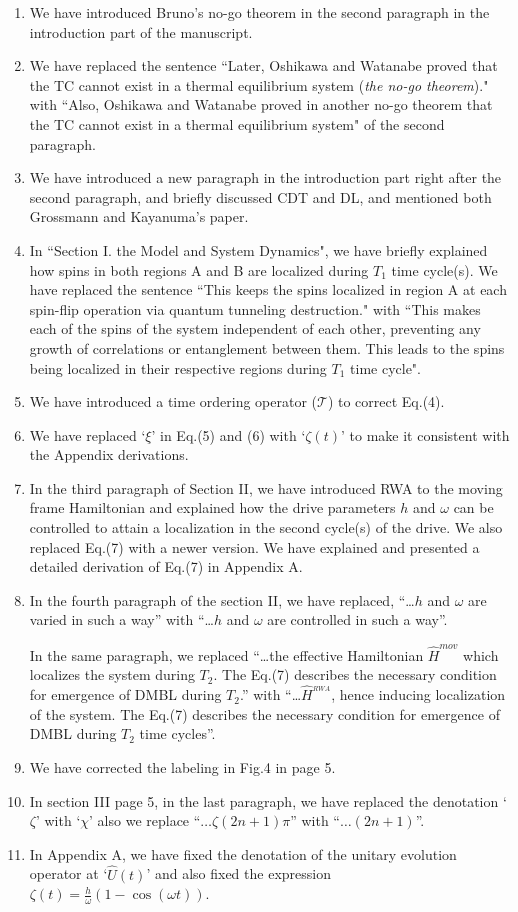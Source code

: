 \documentclass[aps,prb,reprint,showpacs,floatfix,superscriptaddress, onecolumn, 9pt]{revtex4-2}
\begin{document}
\begin{enumerate}
    \item We have introduced Bruno's no-go theorem in the second paragraph in the introduction part of the manuscript.
    \item We have replaced the sentence ``Later, Oshikawa and Watanabe proved that the TC cannot exist in a thermal equilibrium system (\textit{the no-go theorem})." with ``Also, Oshikawa and Watanabe proved in another no-go theorem that the TC cannot exist in a thermal equilibrium system" of the second paragraph.
    \item We have introduced a new paragraph in the introduction part right after the second paragraph, and briefly discussed CDT and DL, and mentioned both Grossmann and Kayanuma’s paper.
    \item In ``Section I. the Model and System Dynamics", we have briefly explained how spins in both regions A and B are localized during $T_1$ time cycle(s). We have replaced the sentence ``This keeps the spins localized in region A at each spin-flip operation via quantum tunneling destruction." with ``This makes each of the spins of the system independent of each other, preventing any growth of correlations or entanglement between them. This leads to the spins being localized in their respective regions during $T_1$ time cycle". 
    \item We have introduced a time ordering operator ($\mathcal{T}$) to correct Eq.(4).
    \item We have replaced `$\xi$' in Eq.(5) and (6) with `$\zeta(t)$' to make it consistent with the Appendix derivations.
    \item In the third paragraph of Section II, we have introduced RWA to the moving frame Hamiltonian and explained how the drive parameters $h$ and $\omega$ can be controlled to attain a localization in the second cycle(s) of the drive. We also replaced Eq.(7) with a newer version. We have explained and presented a detailed derivation of Eq.(7) in Appendix A.
    \item In the fourth paragraph of the section II, we have replaced, ``\dots $h$ and $\omega$  are varied in such a way'' with ``\dots $h$ and $\omega$  are controlled in such a way''. 
    
    In the same paragraph, we replaced ``\dots the effective Hamiltonian $\hat{H}^{mov}$ which localizes the system during $T_2$. The Eq.(7) describes the necessary condition for emergence of DMBL during $T_2$.'' with ``\dots $\hat{H}^{_{RWA}}$, hence inducing localization of the system. The Eq.(7) describes the necessary condition for emergence of DMBL during $T_2$ time cycles''.
    \item We have corrected the labeling in Fig.4 in page 5.
    \item In section III page 5, in the last paragraph, we have replaced the denotation `$\zeta$' with `$\chi$' also we replace ``$\dots\zeta(2n+1)\pi$'' with ``$\dots (2n+1)$''.
    \item In Appendix A, we have fixed the denotation of the unitary evolution operator at `$\hat{U}(t)$' and also fixed the expression $\zeta(t) = \frac{h}{\omega}(1-\cos(\omega t))$. 


\end{enumerate}
\end{document}
